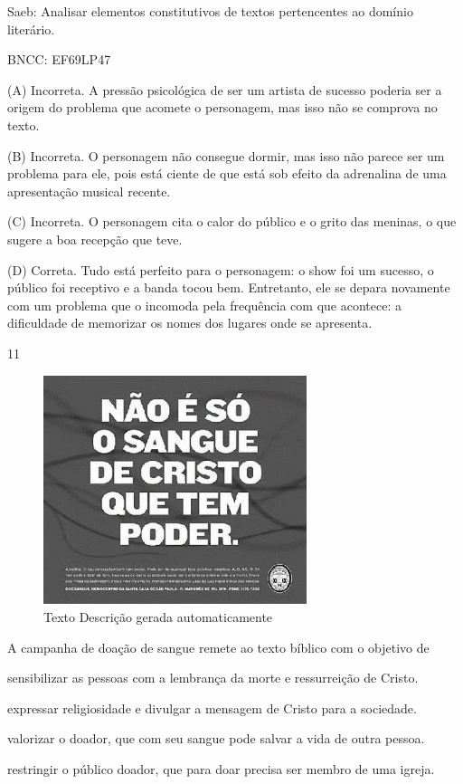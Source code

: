 Saeb: Analisar elementos constitutivos de textos pertencentes ao domínio
literário.

BNCC: EF69LP47

(A) Incorreta. A pressão psicológica de ser um artista de sucesso
poderia ser a origem do problema que acomete o personagem, mas isso não
se comprova no texto.

(B) Incorreta. O personagem não consegue dormir, mas isso não parece ser
um problema para ele, pois está ciente de que está sob efeito da
adrenalina de uma apresentação musical recente.

(C) Incorreta. O personagem cita o calor do público e o grito das
meninas, o que sugere a boa recepção que teve.

(D) Correta. Tudo está perfeito para o personagem: o show foi um
sucesso, o público foi receptivo e a banda tocou bem. Entretanto, ele se
depara novamente com um problema que o incomoda pela frequência com que
acontece: a dificuldade de memorizar os nomes dos lugares onde se
apresenta.

\num{11}

\begin{figure}
\centering
\includegraphics[width=3.03125in,height=2.63521in]{./imgSAEB_8_POR/media/image36.png}
\caption{Texto Descrição gerada automaticamente}
\end{figure}


A campanha de doação de sangue remete ao texto bíblico com o objetivo de

\begin{escolha}
\item sensibilizar as pessoas com a lembrança da morte e ressurreição de
Cristo.
\item expressar religiosidade e divulgar a mensagem de Cristo para a
sociedade.
\item valorizar o doador, que com seu sangue pode salvar a vida de outra
pessoa.
\item restringir o público doador, que para doar precisa ser membro de uma
igreja.
\end{escolha}

